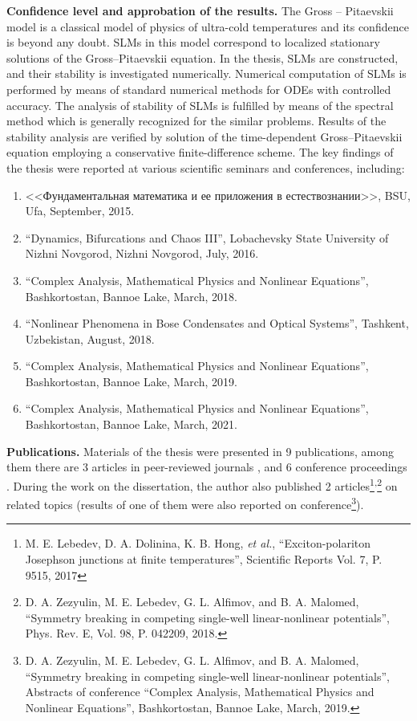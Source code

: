 \documentclass[candidate, href, colorlinks]{disser}
\begin{document}
\textbf{Confidence level and approbation of the results.}
The Gross -- Pitaevskii model is a classical model of physics of ultra-cold temperatures and its confidence is beyond any doubt.
SLMs in this model correspond to localized stationary solutions of the Gross--Pitaevskii equation.
In the thesis, SLMs are constructed, and their stability is investigated numerically.
Numerical computation of SLMs is performed by means of standard numerical methods for ODEs with controlled accuracy.
The analysis of stability of SLMs is fulfilled by means of the spectral method which is generally recognized for the similar problems.
Results of the stability analysis are verified by solution of the time-dependent Gross--Pitaevskii equation employing a conservative finite-difference scheme.
The key findings of the thesis were reported at various scientific seminars and conferences, including:
\begin{enumerate}
	\item <<Фундаментальная математика и ее приложения в естествознании>>, BSU, Ufa, September, 2015.
	\item ``Dynamics, Bifurcations and Chaos III'', Lobachevsky State University of Nizhni Novgorod, Nizhni Novgorod, July, 2016.
	\item ``Complex Analysis, Mathematical Physics and Nonlinear Equations'', Bashkortostan, Bannoe Lake, March, 2018.
	\item ``Nonlinear Phenomena in Bose Condensates and Optical Systems'', Tashkent, Uzbekistan, August, 2018.
	\item ``Complex Analysis, Mathematical Physics and Nonlinear Equations'', Bashkortostan, Bannoe Lake, March, 2019.
	\item ``Complex Analysis, Mathematical Physics and Nonlinear Equations'', Bashkortostan, Bannoe Lake, March, 2021.
\end{enumerate}

\textbf{Publications.}
Materials of the thesis were presented in 9 publications, among them there are 3 articles in peer-reviewed journals \cite{AlfimovLebedev, LebedevAlfimovMalomed, AlfimovGegelLebedevMalomedZezyulin}, and 6 conference proceedings \cite{Ufa2015, NizhniNovgorod2016, Bannoe2018, Tashkent2018, Bannoe2019, Bannoe2021}.
During the work on the dissertation, the author also published 2 articles\footnote{M. E. Lebedev, D. A. Dolinina, K. B. Hong, {\it et al.}, ``Exciton-polariton Josephson junctions at finite temperatures'', Scientific Reports Vol. 7, P. 9515, 2017}\textsuperscript{,}\footnote{D. A. Zezyulin, M. E. Lebedev, G. L. Alfimov, and B. A. Malomed, ``Symmetry breaking in competing single-well linear-nonlinear potentials'', Phys. Rev. E, Vol. 98, P. 042209, 2018.} on related topics (results of one of them were also reported on conference\footnote{D. A. Zezyulin, M. E. Lebedev, G. L. Alfimov, and B. A. Malomed, ``Symmetry breaking in competing single-well linear-nonlinear potentials'', Abstracts of conference ``Complex Analysis, Mathematical Physics and Nonlinear Equations'', Bashkortostan, Bannoe Lake, March, 2019.}).
\end{document}
